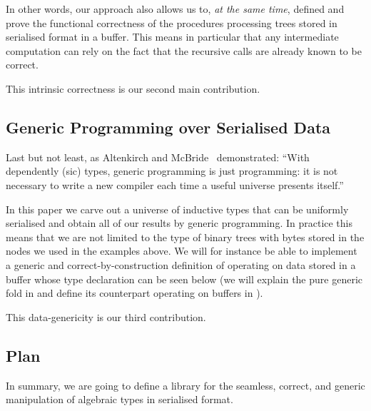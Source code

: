 In other words, our approach also allows us to, \emph{at the same time},
defined and prove the functional correctness of the 
procedures processing trees stored in serialised format in a buffer.
This means in particular that any intermediate computation can rely
on the fact that the recursive calls are already known to be correct.

This intrinsic correctness is our second main contribution.

\subsection{Generic Programming over Serialised Data}

Last but not least,
as Altenkirch and McBride~\citeyearpar{DBLP:conf/ifip2-1/AltenkirchM02}
demonstrated:
``With dependently (sic) types, generic programming is just programming:
it is not necessary to write a new compiler each time a useful
universe presents itself.''

In this paper we carve out a universe of inductive types that can be
uniformly serialised and obtain all of our results by generic programming.
%
In practice this means that we are not limited to the type of binary trees
with bytes stored in the nodes we used in the examples above.
%
We will for instance be able to implement
a generic and correct-by-construction
definition of  operating on data stored in a buffer
whose type declaration can be seen below
(we will explain the pure generic fold in 
and define its counterpart operating on buffers in ).


This data-genericity is our third contribution.

\subsection{Plan}

In summary, we are going to define a library for the
seamless,
correct,
and generic
manipulation of algebraic types in serialised format.


